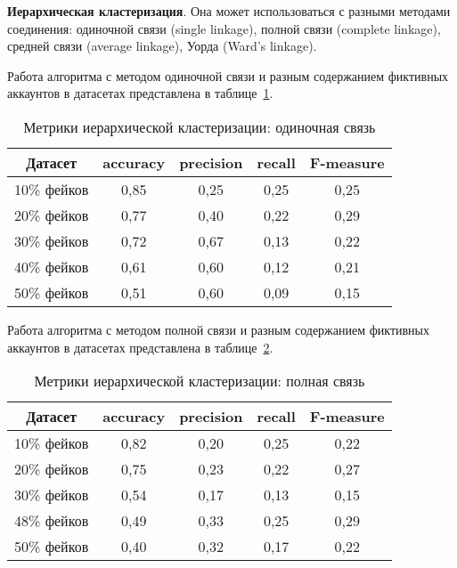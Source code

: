 \textbf{Иерархическая кластеризация}. Она может использоваться с разными методами соединения: одиночной связи (single linkage), полной связи (complete linkage), средней связи (average linkage), Уорда (Ward's linkage).

Работа алгоритма с методом одиночной связи и разным содержанием фиктивных аккаунтов в датасетах представлена в таблице~\ref{tabular:hierclustering1}.
\vspace{-0.5em}
\begin{table}[H]
    \caption{Метрики иерархической кластеризации: одиночная связь}
    \vspace{1em}
    \small
    \begin{tabular}{|l|c|c|c|c|}
    \hline
    \multicolumn{1}{|c|}{\textbf{Датасет}} & \textbf{accuracy} & \textbf{precision} & \textbf{recall} & \textbf{F-measure} \\ \hline
    10\% фейков & 0,85 & 0,25 & 0,25 & 0,25 \\ \hline
    20\% фейков & 0,77 & 0,40 & 0,22 & 0,29 \\ \hline
    30\% фейков & 0,72 & 0,67 & 0,13 & 0,22 \\ \hline
    40\% фейков & 0,61 & 0,60 & 0,12 & 0,21 \\ \hline
    50\% фейков & 0,51 & 0,60 & 0,09 & 0,15 \\ \hline
    \end{tabular}
    \label{tabular:hierclustering1}
\end{table}

Работа алгоритма с методом полной связи и разным содержанием фиктивных аккаунтов в датасетах представлена в таблице~\ref{tabular:hierclustering2}.

\begin{table}[H]
    \caption{Метрики иерархической кластеризации: полная связь}
    \vspace{1em}
    \small
    \begin{tabular}{|l|c|c|c|c|}
    \hline
    \multicolumn{1}{|c|}{\textbf{Датасет}} & \textbf{accuracy} & \textbf{precision} & \textbf{recall} & \textbf{F-measure} \\ \hline
    10\% фейков & 0,82 & 0,20 & 0,25 & 0,22 \\ \hline
    20\% фейков & 0,75 & 0,23 & 0,22 & 0,27 \\ \hline
    30\% фейков & 0,54 & 0,17 & 0,13 & 0,15 \\ \hline
    48\% фейков & 0,49 & 0,33 & 0,25 & 0,29 \\ \hline
    50\% фейков & 0,40 & 0,32 & 0,17 & 0,22 \\ \hline
    \end{tabular}
    \label{tabular:hierclustering2}
\end{table}

